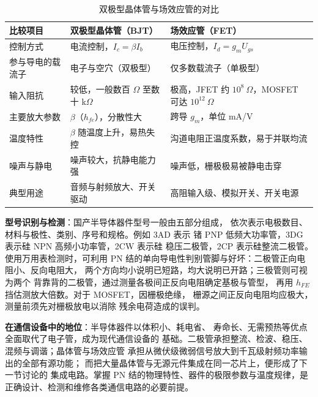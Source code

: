 \begin{table}[htbp]
\centering
\caption{双极型晶体管与场效应管的对比}
\begin{tabular}{|p{2.6cm}|p{4.0cm}|p{4.4cm}|}
\hline
\textbf{比较项目} & \textbf{双极型晶体管（BJT）} & \textbf{场效应管（FET）} \\
\hline
控制方式 & 电流控制，$I_c = \beta I_b$ & 电压控制，$I_d = g_m U_{gs}$ \\
\hline
参与导电的载流子 & 电子与空穴（双极型） & 仅多数载流子（单极型） \\
\hline
输入阻抗 & 较低，一般数百 $\Omega$ 至数十 k$\Omega$ & 极高，JFET 约 $10^{8}\ \Omega$，MOSFET 可达 $10^{12}\ \Omega$ \\
\hline
主要放大参数 & $\beta$（$h_{fe}$），分散性大 & 跨导 $g_m$，单位 mA/V \\
\hline
温度特性 & $\beta$ 随温度上升，易热失控 & 沟道电阻正温度系数，易于并联均流 \\
\hline
噪声与静电 & 噪声较大，抗静电能力强 & 噪声低，栅极极易被静电击穿 \\
\hline
典型用途 & 音频与射频放大、开关驱动 & 高阻输入级、模拟开关、开关电源 \\
\hline
\end{tabular}
\end{table}

\textbf{型号识别与检测}：国产半导体器件型号一般由五部分组成，
依次表示电极数目、材料与极性、类别、序号和规格。例如 3AD 表示
锗 PNP 低频大功率管，3DG 表示硅 NPN 高频小功率管，2CW 表示硅
稳压二极管，2CP 表示硅整流二极管。使用万用表检测时，可利用
PN 结的单向导电性判别管脚与好坏：二极管正向电阻小、反向电阻大，
两个方向均小说明已短路，均大说明已开路；三极管则可视为两个
背靠背的二极管，通过测量各极间正反向电阻确定基极与管型，
再用 $h_{FE}$ 挡估测放大倍数。对于 MOSFET，因栅极绝缘，
栅源之间正反向电阻均应极大，测量前须先对栅极放电以消除
残余电荷造成的误判。

\textbf{在通信设备中的地位}：半导体器件以体积小、耗电省、
寿命长、无需预热等优点全面取代了电子管，成为现代通信设备的
基础。二极管承担整流、检波、稳压、混频与调谐；晶体管与场效应管
承担从微伏级微弱信号放大到千瓦级射频功率输出的全部有源功能；
而把大量晶体管与无源元件集成在同一芯片上，便形成了下一节讨论的
集成电路。掌握 PN 结的物理特性、器件的极限参数与温度规律，是
正确设计、检测和维修各类通信电路的必要前提。
